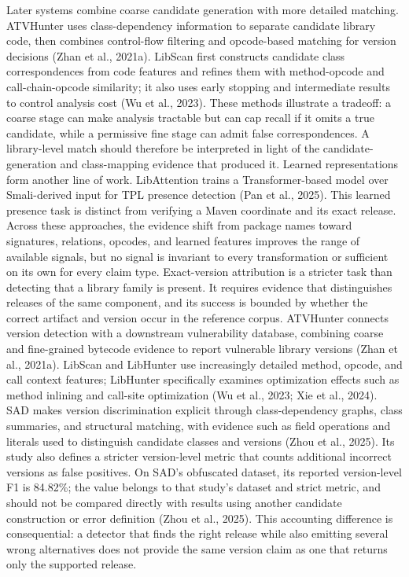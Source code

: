 \documentclass[10pt,twocolumn]{article}
\begin{document}
Later systems combine coarse candidate generation with more detailed matching. ATVHunter uses class-dependency information to separate candidate library code, then combines control-flow filtering and opcode-based matching for version decisions (Zhan et al., 2021a). LibScan first constructs candidate class correspondences from code features and refines them with method-opcode and call-chain-opcode similarity; it also uses early stopping and intermediate results to control analysis cost (Wu et al., 2023). These methods illustrate a tradeoff: a coarse stage can make analysis tractable but can cap recall if it omits a true candidate, while a permissive fine stage can admit false correspondences. A library-level match should therefore be interpreted in light of the candidate-generation and class-mapping evidence that produced it.
Learned representations form another line of work. LibAttention trains a Transformer-based model over Smali-derived input for TPL presence detection (Pan et al., 2025). This learned presence task is distinct from verifying a Maven coordinate and its exact release. Across these approaches, the evidence shift from package names toward signatures, relations, opcodes, and learned features improves the range of available signals, but no signal is invariant to every transformation or sufficient on its own for every claim type.
Exact-version attribution is a stricter task than detecting that a library family is present. It requires evidence that distinguishes releases of the same component, and its success is bounded by whether the correct artifact and version occur in the reference corpus. ATVHunter connects version detection with a downstream vulnerability database, combining coarse and fine-grained bytecode evidence to report vulnerable library versions (Zhan et al., 2021a). LibScan and LibHunter use increasingly detailed method, opcode, and call context features; LibHunter specifically examines optimization effects such as method inlining and call-site optimization (Wu et al., 2023; Xie et al., 2024).
SAD makes version discrimination explicit through class-dependency graphs, class summaries, and structural matching, with evidence such as field operations and literals used to distinguish candidate classes and versions (Zhou et al., 2025). Its study also defines a stricter version-level metric that counts additional incorrect versions as false positives. On SAD's obfuscated dataset, its reported version-level F1 is 84.82\%; the value belongs to that study's dataset and strict metric, and should not be compared directly with results using another candidate construction or error definition (Zhou et al., 2025). This accounting difference is consequential: a detector that finds the right release while also emitting several wrong alternatives does not provide the same version claim as one that returns only the supported release.
\end{document}
